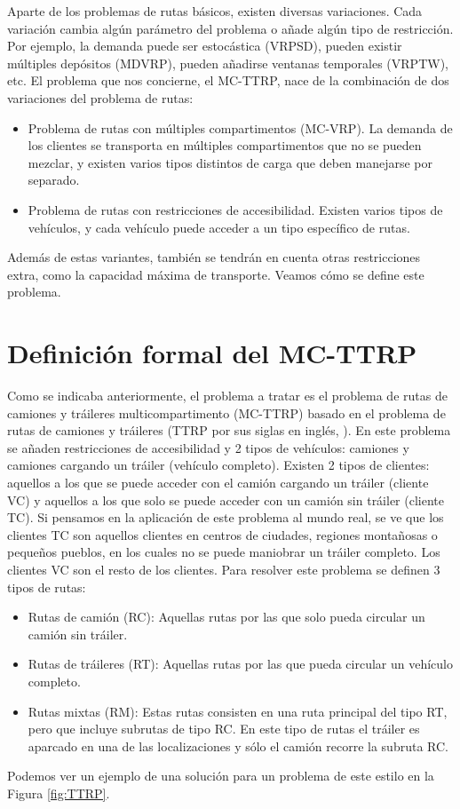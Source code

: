Aparte de los problemas de rutas básicos, existen diversas variaciones. Cada variación cambia algún parámetro del problema o añade algún tipo de restricción. Por ejemplo, la demanda puede ser estocástica (VRPSD), pueden existir múltiples depósitos (MDVRP), pueden añadirse ventanas temporales (VRPTW), etc. El problema que nos concierne, el MC-TTRP, nace de la combinación de dos variaciones del problema de rutas:
\begin{itemize}
    \item Problema de rutas con múltiples compartimentos (MC-VRP). La demanda de los clientes se transporta en múltiples compartimentos que no se pueden mezclar, y existen varios tipos distintos de carga que deben manejarse por separado.
    \item Problema de rutas con restricciones de accesibilidad. Existen varios tipos de vehículos, y cada vehículo puede acceder a un tipo específico de rutas.
\end{itemize}

Además de estas variantes, también se tendrán en cuenta otras restricciones extra, como la capacidad máxima de transporte. Veamos cómo se define este problema.

\section{Definición formal del MC-TTRP}
Como se indicaba anteriormente, el problema a tratar es el problema de rutas de camiones y tráileres multicompartimento (MC-TTRP) basado en el problema de rutas de camiones y tráileres (TTRP por sus siglas en inglés, \cite{chao-ttrp}). En este problema se añaden restricciones de accesibilidad y 2 tipos de vehículos: camiones y camiones cargando un tráiler (vehículo completo). Existen 2 tipos de clientes: aquellos a los que se puede acceder con el camión cargando un tráiler (cliente VC) y aquellos a los que solo se puede acceder con un camión sin tráiler (cliente TC). Si pensamos en la aplicación de este problema al mundo real, se ve que los clientes TC son aquellos clientes en centros de ciudades, regiones montañosas o pequeños pueblos, en los cuales no se puede maniobrar un tráiler completo. Los clientes VC son el resto de los clientes. Para resolver este problema se definen 3 tipos de rutas:
\begin{itemize}
    \item Rutas de camión (RC): Aquellas rutas por las que solo pueda circular un camión sin tráiler.
    \item Rutas de tráileres (RT): Aquellas rutas por las que pueda circular un vehículo completo.
    \item Rutas mixtas (RM): Estas rutas consisten en una ruta principal del tipo RT, pero que incluye subrutas de tipo RC. En este tipo de rutas el tráiler es aparcado en una de las localizaciones y sólo el camión recorre la subruta RC.
\end{itemize}
Podemos ver un ejemplo de una solución para un problema de este estilo en la Figura \ref{fig:TTRP}.

